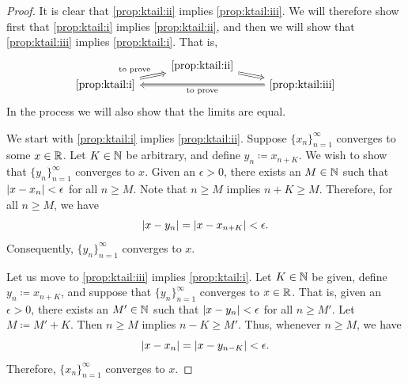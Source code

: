 \begin{proof}
It is clear that
\ref{prop:ktail:ii} implies \ref{prop:ktail:iii}.
We will therefore show first that
\ref{prop:ktail:i}
implies
\ref{prop:ktail:ii},
and then we will show that
\ref{prop:ktail:iii}
implies
\ref{prop:ktail:i}.  That is, 
\begin{equation*}
\begin{tikzcd}[row sep=0pt]
& \text{\ref{prop:ktail:ii}} \ar[dr, Rightarrow] & \\
\text{\ref{prop:ktail:i}} \ar[ur, Rightarrow, "\text{to prove}"] & &
\text{\ref{prop:ktail:iii}} \ar[ll, Rightarrow, "\text{to prove}"] 
\end{tikzcd}
\end{equation*}
In the process we will also show that the limits are equal.

We start with \ref{prop:ktail:i} implies \ref{prop:ktail:ii}.
Suppose $\{x_n \}_{n=1}^\infty$ converges to some $x \in {\mathbb{R}}$.
Let $K \in {\mathbb{N}}$ be arbitrary, and
define $y_n \coloneqq x_{n+K}$.  We wish to show that $\{ y_n \}_{n=1}^\infty$ converges
to $x$.
Given an $\epsilon > 0$, there exists an $M \in {\mathbb{N}}$ such that
$\lvert {x-x_n} \rvert < \epsilon$ for all $n \geq M$.
Note that $n \geq M$ implies $n+K \geq M$.  Therefore, for
all $n \geq M$, we have
\begin{equation*}
\lvert {x-y_n} \rvert = \lvert {x-x_{n+K}} \rvert < \epsilon .
\end{equation*}
Consequently, $\{ y_n \}_{n=1}^\infty$ converges to $x$.

Let us move to \ref{prop:ktail:iii} implies \ref{prop:ktail:i}.
Let $K \in {\mathbb{N}}$ be given, define
$y_n \coloneqq x_{n+K}$, and suppose that $\{ y_n \}_{n=1}^\infty$ converges to $x \in {\mathbb{R}}$.
That is, given an $\epsilon > 0$, there exists an $M' \in {\mathbb{N}}$ such that
$\lvert {x-y_n} \rvert < \epsilon$ for all $n \geq M'$.
Let $M \coloneqq M'+K$.  Then $n \geq M$ implies $n-K \geq M'$.
Thus, whenever $n \geq M$, we have
\begin{equation*}
\lvert {x-x_n} \rvert = \lvert {x-y_{n-K}} \rvert < \epsilon.
\end{equation*}
Therefore, $\{ x_n \}_{n=1}^\infty$ converges to $x$.
\end{proof}

